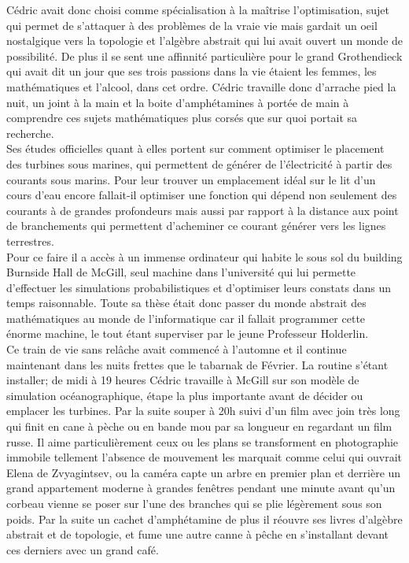 \documentclass{article}
\begin{document}
Cédric avait donc choisi comme spécialisation à la maîtrise l'optimisation,
sujet qui permet de s'attaquer à des problèmes de la vraie vie mais gardait un
oeil nostalgique vers la topologie et l'algèbre abstrait qui lui avait ouvert un
monde de possibilité. De plus il se sent une affinnité particulière pour le
grand Grothendieck qui avait dit un jour que ses trois passions dans la vie
étaient les femmes, les mathématiques et l'alcool, dans cet ordre. Cédric
travaille donc d'arrache pied la nuit, un joint à la main et la boite
d'amphétamines à portée de main à comprendre ces sujets mathématiques plus
corsés que sur quoi portait sa recherche. \\

Ses études officielles quant à elles portent sur comment optimiser le
placement des turbines sous marines, qui permettent de générer de l'électricité
à partir des courants sous marins. Pour leur trouver un emplacement idéal sur le
lit d'un cours d'eau encore fallait-il optimiser une fonction qui dépend non
seulement des courants à de grandes profondeurs mais aussi par rapport à la
distance aux point de branchements qui permettent d'acheminer ce courant
générer vers les lignes terrestres. \\

Pour ce faire il a accès à un immense ordinateur qui habite le sous sol du
building Burnside Hall de McGill, seul machine dans l'université qui lui
permette d'effectuer les simulations probabilistiques et d'optimiser leurs
constats dans un temps raisonnable. Toute sa thèse était donc passer du monde
abstrait des mathématiques au monde de l'informatique car il fallait programmer
cette énorme machine, le tout étant superviser par le jeune Professeur
Holderlin.\\

Ce train de vie sans relâche avait commencé à l'automne et il continue
maintenant dans les nuits frettes que le tabarnak de Février. La routine s'étant
installer; de midi à 19 heures Cédric travaille à McGill sur son modèle de
simulation océanographique, étape la plus importante avant de décider ou
emplacer les turbines. Par la suite souper à 20h suivi d'un film avec join très
long qui finit en cane à pèche ou en bande mou par sa longueur en regardant
un film russe. Il aime particulièrement ceux ou les plans se transforment en
photographie immobile tellement l'absence de mouvement les marquait comme celui
qui ouvrait Elena de Zvyagintsev, ou la caméra capte un arbre en premier plan et
derrière un grand appartement moderne à grandes fenêtres pendant une minute
avant qu'un corbeau vienne se poser sur l'une des branches qui se plie
légèrement sous son poids. Par la suite un cachet d'amphétamine de plus il
réouvre ses livres d'algèbre abstrait et de topologie, et fume une autre
canne à pêche en s'installant devant ces derniers avec un grand café.\\
\end{document}
